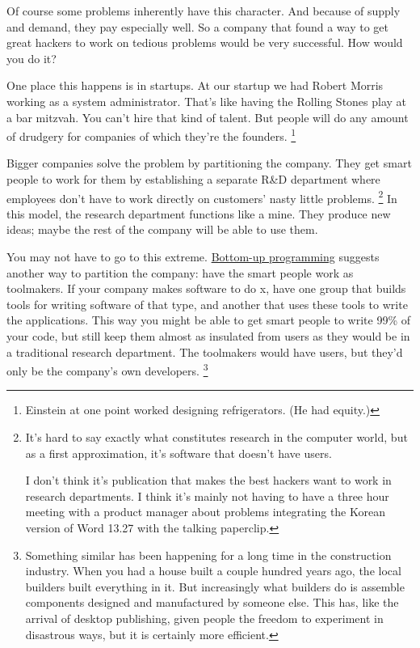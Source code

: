 \documentclass[12pt]{book}
\begin{document}
Of course some problems inherently have this character. And because of
supply and demand, they pay especially well. So a company that found a
way to get great hackers to work on tedious problems would be very
successful. How would you do it?

One place this happens is in startups. At our startup we had Robert
Morris working as a system administrator. That's like having the Rolling
Stones play at a bar mitzvah. You can't hire that kind of talent. But
people will do any amount of drudgery for companies of which they're the
founders. \footnote{Einstein at one point worked designing refrigerators. (He had
equity.)}

Bigger companies solve the problem by partitioning the company. They get
smart people to work for them by establishing a separate R\&D department
where employees don't have to work directly on customers' nasty little
problems. \footnote{It's hard to say exactly what constitutes research in the
computer world, but as a first approximation, it's software that doesn't
have users.

I don't think it's publication that makes the best hackers want to work
in research departments. I think it's mainly not having to have a three
hour meeting with a product manager about problems integrating the
Korean version of Word 13.27 with the talking paperclip.} In this model, the research department functions like
a mine. They produce new ideas; maybe the rest of the company will be
able to use them.

You may not have to go to this extreme. \href{progbot.html}{Bottom-up
programming} suggests another way to partition the company: have the
smart people work as toolmakers. If your company makes software to do x,
have one group that builds tools for writing software of that type, and
another that uses these tools to write the applications. This way you
might be able to get smart people to write 99\% of your code, but still
keep them almost as insulated from users as they would be in a
traditional research department. The toolmakers would have users, but
they'd only be the company's own developers. \footnote{Something similar has been happening for a long time in the
construction industry. When you had a house built a couple hundred years
ago, the local builders built everything in it. But increasingly what
builders do is assemble components designed and manufactured by someone
else. This has, like the arrival of desktop publishing, given people the
freedom to experiment in disastrous ways, but it is certainly more
efficient.}
\end{document}
